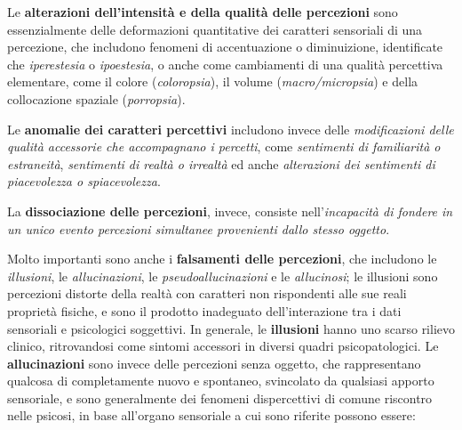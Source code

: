 \documentclass[]{article}
\begin{document}
Le \textbf{alterazioni dell'intensità e della qualità delle percezioni}
sono essenzialmente delle deformazioni quantitative dei caratteri
sensoriali di una percezione, che includono fenomeni di accentuazione o
diminuizione, identificate che \emph{iperestesia} o \emph{ipoestesia}, o
anche come cambiamenti di una qualità percettiva elementare, come il
colore (\emph{coloropsia}), il volume (\emph{macro/micropsia}) e della
collocazione spaziale (\emph{porropsia}).

Le \textbf{anomalie dei caratteri percettivi} includono invece delle
\emph{modificazioni delle qualità accessorie che accompagnano i
percetti}, come \emph{sentimenti di familiarità o estraneità},
\emph{sentimenti di realtà o irrealtà} ed anche \emph{alterazioni dei
sentimenti di piacevolezza o spiacevolezza}.

La \textbf{dissociazione delle percezioni}, invece, consiste
nell'\emph{incapacità di fondere in un unico evento percezioni
simultanee provenienti dallo stesso oggetto}.

Molto importanti sono anche i \textbf{falsamenti delle percezioni}, che
includono le \emph{illusioni}, le \emph{allucinazioni}, le
\emph{pseudoallucinazioni} e le \emph{allucinosi}; le illusioni sono
percezioni distorte della realtà con caratteri non rispondenti alle sue
reali proprietà fisiche, e sono il prodotto inadeguato dell'interazione
tra i dati sensoriali e psicologici soggettivi. In generale, le
\textbf{illusioni} hanno uno scarso rilievo clinico, ritrovandosi come
sintomi accessori in diversi quadri psicopatologici. Le
\textbf{allucinazioni} sono invece delle percezioni senza oggetto, che
rappresentano qualcosa di completamente nuovo e spontaneo, svincolato da
qualsiasi apporto sensoriale, e sono generalmente dei fenomeni
dispercettivi di comune riscontro nelle psicosi, in base all'organo
sensoriale a cui sono riferite possono essere:
\end{document}
